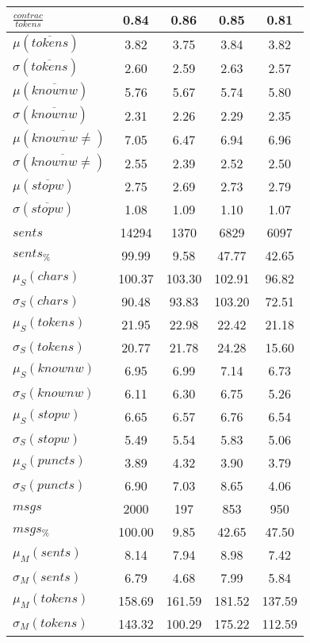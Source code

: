 \begin{table}[h!]
\begin{center}
\begin{tabular}{| l || c | c | c | c |}
$\frac{contrac}{tokens}$ & 0.84  & 0.86  & 0.85  & 0.81 \\\hline\hline
$\mu(\overline{tokens})$ & 3.82  & 3.75  & 3.84  & 3.82 \\
$\sigma(\overline{tokens})$ & 2.60  & 2.59  & 2.63  & 2.57 \\\hline
$\mu(\overline{knownw})$ & 5.76  & 5.67  & 5.74  & 5.80 \\
$\sigma(\overline{knownw})$ & 2.31  & 2.26  & 2.29  & 2.35 \\\hline
$\mu(\overline{knownw \neq})$ & 7.05  & 6.47  & 6.94  & 6.96 \\
$\sigma(\overline{knownw \neq})$ & 2.55  & 2.39  & 2.52  & 2.50 \\\hline
$\mu(\overline{stopw})$ & 2.75  & 2.69  & 2.73  & 2.79 \\
$\sigma(\overline{stopw})$ & 1.08  & 1.09  & 1.10  & 1.07 \\\hline\hline
$sents$ & 14294  & 1370  & 6829  & 6097 \\
$sents_{\%}$ & 99.99  & 9.58  & 47.77  & 42.65 \\\hline
$\mu_S(chars)$ & 100.37  & 103.30  & 102.91  & 96.82 \\
$\sigma_S(chars)$ & 90.48  & 93.83  & 103.20  & 72.51 \\\hline
$\mu_S(tokens)$ & 21.95  & 22.98  & 22.42  & 21.18 \\
$\sigma_S(tokens)$ & 20.77  & 21.78  & 24.28  & 15.60 \\\hline
$\mu_S(knownw)$ & 6.95  & 6.99  & 7.14  & 6.73 \\
$\sigma_S(knownw)$ & 6.11  & 6.30  & 6.75  & 5.26 \\\hline
$\mu_S(stopw)$ & 6.65  & 6.57  & 6.76  & 6.54 \\
$\sigma_S(stopw)$ & 5.49  & 5.54  & 5.83  & 5.06 \\\hline
$\mu_S(puncts)$ & 3.89  & 4.32  & 3.90  & 3.79 \\
$\sigma_S(puncts)$ & 6.90  & 7.03  & 8.65  & 4.06 \\\hline\hline
$msgs$ & 2000  & 197  & 853  & 950 \\
$msgs_{\%}$ & 100.00  & 9.85  & 42.65  & 47.50 \\\hline
$\mu_M(sents)$ & 8.14  & 7.94  & 8.98  & 7.42 \\
$\sigma_M(sents)$ & 6.79  & 4.68  & 7.99  & 5.84 \\\hline
$\mu_M(tokens)$ & 158.69  & 161.59  & 181.52  & 137.59 \\
$\sigma_M(tokens)$ & 143.32  & 100.29  & 175.22  & 112.59 \\\hline

\end{tabular}
\end{center}
\end{table}
